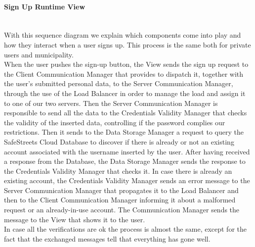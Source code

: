 \documentclass[titlepage]{article}
\begin{document}
\paragraph{Sign Up Runtime View\\ \\}
With this sequence diagram we explain which components come into play and how they interact when a user signs up.
This process is the same both for private users and municipality.\\
When the user pushes the sign-up button, the View sends the sign up request to the Client Communication Manager that provides to dispatch it, together with the user's submitted personal data, to the Server Communication Manager, through the use of the Load Balancer in order to manage the load and assign it to one of our two servers. Then the Server Communication Manager is responsible to send all the data to the Credentials Validity Manager that checks the validity of the inserted data, controlling if the password complies our restrictions. Then it sends to the Data Storage Manager a request to query the SafeStreets Cloud Database to discover if there is already or not an existing account associated with the username inserted by the user. After having received a response from the Database, the Data Storage Manager sends the response to the Credentials Validity Manager that checks it. In case there is already an existing account, the Credentials Validity Manager sends an error message to the Server Communication Manager that propagates it to the Load Balancer and then to the Client Communication Manager informing it about a malformed request or an already-in-use account. The Communication Manager sends the message to the View that shows it to the user. \\
In case all the verifications are ok the process is almost the same, except for the fact that the exchanged messages tell that everything has gone well.
\end{document}
